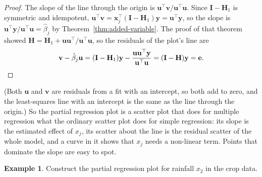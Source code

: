 \documentclass[11pt,a4paper]{article}
\numberwithin{equation}{section}
\theoremstyle{definition}
\newtheorem{exa}[thm]{Example}
\begin{document}
\begin{proof}
The slope of the line through the origin is $\mathbf{u}^\top\mathbf{v}/\mathbf{u}^\top\mathbf{u}$.
Since $\mathbf{I} - \mathbf{H}_1$ is symmetric and idempotent,
$\mathbf{u}^\top\mathbf{v} = \mathbf{x}_j^\top(\mathbf{I} - \mathbf{H}_1)\mathbf{y} = \mathbf{u}^\top\mathbf{y}$,
so the slope is $\mathbf{u}^\top\mathbf{y}/\mathbf{u}^\top\mathbf{u} = \hat\beta_j$ by
Theorem~\ref{thm:added-variable}. The proof of that theorem showed
$\mathbf{H} = \mathbf{H}_1 + \mathbf{u}\mathbf{u}^\top/\mathbf{u}^\top\mathbf{u}$, so the
residuals of the plot's line are
\[
\mathbf{v} - \hat\beta_j\mathbf{u}
= (\mathbf{I} - \mathbf{H}_1)\mathbf{y} - \frac{\mathbf{u}\mathbf{u}^\top\mathbf{y}}{\mathbf{u}^\top\mathbf{u}}
= (\mathbf{I} - \mathbf{H})\mathbf{y} = \mathbf{e} . \qedhere
\]
\end{proof}

(Both $\mathbf{u}$ and $\mathbf{v}$ are residuals from a fit with an intercept, so both add
to zero, and the least-squares line with an intercept is the same as the line through the
origin.) So the partial regression plot is a scatter plot that does for multiple regression
what the ordinary scatter plot does for simple regression: its slope is the estimated
effect of $x_j$, its scatter about the line is the residual scatter of the whole model, and
a curve in it shows that $x_j$ needs a non-linear term. Points that dominate the slope are
easy to spot.

\begin{exa}\label{exa:crop-avp}
Construct the partial regression plot for rainfall $x_2$ in the crop data.
\end{exa}
\end{document}

